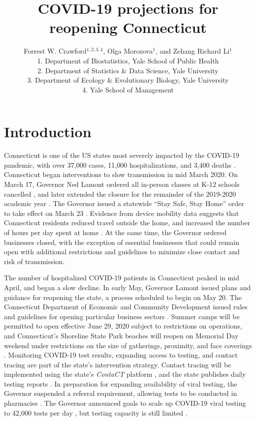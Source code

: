 \documentclass[11pt]{article}
\title{COVID-19 projections for reopening Connecticut}
\author{
  Forrest W. Crawford$^{1,2,3,4}$,
  Olga Morozova$^{1}$, 
  and
  Zehang Richard Li$^1$
  \\[1em]
\small 1. Department of Biostatistics, Yale School of Public Health \\
\small 2. Department of Statistics \& Data Science, Yale University \\
\small 3. Department of Ecology \& Evolutionary Biology, Yale University \\
\small 4. Yale School of Management }
\begin{document}
\maketitle



\section*{Introduction}

Connecticut is one of the US states most severely impacted by the COVID-19 pandemic, with over 37,000 cases, 11,000 hospitalizations, and 3,400 deaths \citep{nyt2020Connecticut,atlantic2020data}.  Connecticut began interventions to slow transmission in mid March 2020.  On March 17, Governor Ned Lamont ordered all in-person classes at K-12 schools cancelled \citep{lamont2020exec7c}, and later extended the closure for the remainder of the 2019-2020 academic year \citep{lamont2020exec7l,lamont2020exec7x,lamont2020exec7ii}.  The Governor issued a statewide ``Stay Safe, Stay Home'' order to take effect on March 23 \citep{lamont2020exec7h}.  Evidence from device mobility data suggests that Connecticut residents reduced travel outside the home, and increased the number of hours per day spent at home \citep{google2020covid,facebook2020covid}. At the same time, the Governor ordered businesses closed, with the exception of essential businesses that could remain open with additional restrictions and guidelines to minimize close contact and risk of transmission. 



The number of hospitalized COVID-19 patients in Connecticut peaked in mid April, and began a slow decline.  In early May, Governor Lamont issued plans and guidance for reopening the state, a process scheduled to begin on May 20. The Connecticut Department of Economic and Community Development issued rules and guidelines for opening particular business sectors \citep{decd2020coronavirus}. Summer camps will be permitted to open effective June 29, 2020 subject to restrictions on operations, and Connecticut's Shoreline State Park beaches will reopen on Memorial Day weekend under restrictions on the size of gatherings, proximity, and face coverings \citep{ct2020parks}.  Monitoring COVID-19 test results, expanding access to testing, and contact tracing are part of the state's intervention strategy.  Contact tracing will be implemented using the state's \emph{ContaCT} platform \citep{ct2020contact}, and the state publishes daily testing reports \citep[e.g.][]{ct2020testing}. In preparation for expanding availability of viral testing, the Governor suspended a referral requirement, allowing tests to be conducted in pharmacies \citep{lamont2020suspension,lamont2020exec7kk}. The Governor announced goals to scale up COVID-19 viral testing to 42,000 tests per day \citep{phaneuf2020lamont}, but testing capacity is still limited \cite{thomas2020surge}. 
\end{document}
